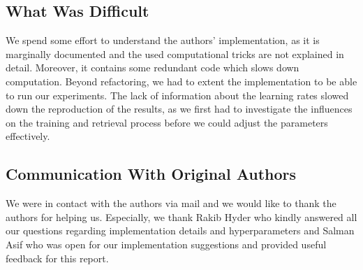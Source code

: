 \subsection*{What Was Difficult}


We spend some effort to understand the authors' implementation, as it is marginally documented and the used computational tricks are not explained in detail. Moreover, it contains some redundant code which slows down computation. Beyond refactoring, we had to extent the implementation to be able to run our experiments. The lack of information about the learning rates slowed down the reproduction of the results, as we first had to investigate the influences on the training and retrieval process before we could adjust the parameters effectively.

\subsection*{Communication With Original Authors}


We were in contact with the authors via mail and we would like to
thank the authors for helping us.  Especially, we thank Rakib Hyder
who kindly answered all our questions regarding implementation details
and hyperparameters and Salman Asif who was open for our
implementation suggestions and provided useful feedback for this
report.





